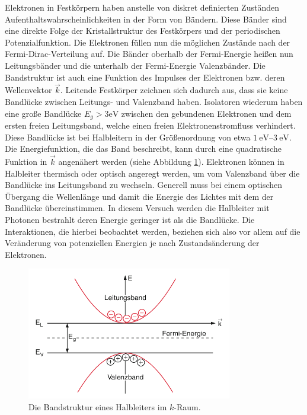 Elektronen in Festkörpern haben anstelle von diskret definierten Zuständen
Aufenthaltswahrscheinlichkeiten in der Form von Bändern. Diese Bänder sind eine
direkte Folge der Kristallstruktur des Festkörpers und der periodischen
Potenzialfunktion.
Die Elektronen füllen nun die möglichen Zustände nach der
Fermi-Dirac-Verteilung auf. Die Bänder oberhalb der Fermi-Energie heißen nun
Leitungsbänder und die unterhalb der Fermi-Energie Valenzbänder. Die
Bandstruktur ist auch eine Funktion des Impulses der Elektronen bzw. deren
Wellenvektor $\vec{k}$. Leitende Festkörper zeichnen sich dadurch aus, dass sie
keine Bandlücke zwischen Leitungs- und Valenzband haben. Isolatoren wiederum
haben eine große Bandlücke $E_g > 3 \unit{\eV}$ \cite{web:Bandlücke} zwischen
den gebundenen Elektronen und dem ersten freien Leitungsband, welche einen
freien Elektronenstromfluss verhindert. Diese Bandlücke ist bei Halbleitern in
der Größenordnung von etwa $\qtyrange{1}{3}{\eV}$\cite{web:Bandlücke}. Die
Energiefunktion, die das Band beschreibt, kann durch eine quadratische Funktion
in $\vec{k}$ angenähert werden (siehe Abbildung \ref{fig:band}). Elektronen
können in Halbleiter thermisch oder optisch angeregt werden, um vom Valenzband
über die Bandlücke ins Leitungsband zu wechseln.
Generell muss bei einem optischen Übergang die Wellenlänge und damit die
Energie des Lichtes mit dem der Bandlücke übereinstimmen. In diesem Versuch
werden die Halbleiter mit Photonen bestrahlt deren Energie geringer ist als die
Bandlücke. Die Interaktionen, die hierbei beobachtet werden, beziehen sich also
vor allem auf die Veränderung von potenziellen Energien je nach
Zustandsänderung der Elektronen.

\begin{figure}
	\centering
	\includegraphics[width=0.8\textwidth]{./Bilder/bandstrukt.png}
	\caption{Die Bandstruktur eines Halbleiters im $k$-Raum\cite{book:expi3}.}\label{fig:band}
\end{figure}

